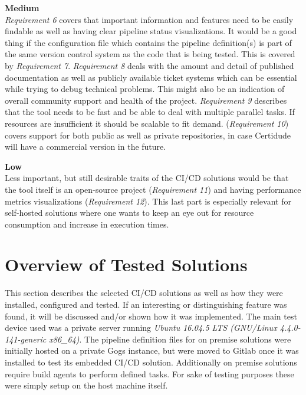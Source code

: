 \pagebreak

\textbf{Medium}\\
\textit{Requirement 6} covers that important information and features need to be easily findable as well as having clear pipeline status visualizations. It would be a good thing if the configuration file which contains the pipeline definition(s) is part of the same version control system as the code that is being tested. This is covered by \textit{Requirement 7}. \textit{Requirement 8} deals with the amount and detail of published documentation as well as publicly available ticket systems which can be essential while trying to debug technical problems. This might also be an indication of overall community support and health of the project. \textit{Requirement 9} describes that the tool needs to be fast and be able to deal with multiple parallel tasks. If resources are insufficient it should be scalable to fit demand. (\textit{Requirement 10}) covers support for both public as well as private repositories, in case Certidude will have a commercial version in the future.

\textbf{Low}\\
Less important, but still desirable traits of the CI/CD solutions would be that the tool itself is an open-source project (\textit{Requirement 11}) and having performance metrics visualizations (\textit{Requirement 12}). This last part is especially relevant for self-hosted solutions where one wants to keep an eye out for resource consumption and increase in execution times.


\section{Overview of Tested Solutions}
%
This section describes the selected CI/CD solutions as well as how they were installed, configured and tested. If an interesting or distinguishing feature was found, it will be discussed and/or shown how it was implemented. The main test device used was a private server running \textit{Ubuntu 16.04.5 LTS (GNU/Linux 4.4.0-141-generic x86\_64)}. The pipeline definition files for on premise solutions were initially hosted on a private Gogs instance, but were moved to Gitlab once it was installed to test its embedded CI/CD solution. Additionally on premise solutions require build agents to perform defined tasks. For sake of testing purposes these were simply setup on the host machine itself.

